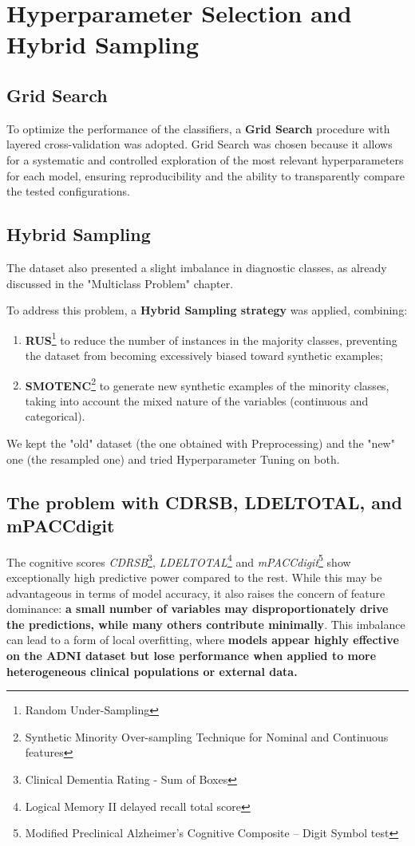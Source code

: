 \section{Hyperparameter Selection and Hybrid Sampling}
\subsection{Grid Search}
To optimize the performance of the classifiers, a \textbf{Grid Search} procedure with layered cross-validation was adopted. Grid Search was chosen because it allows for a systematic and controlled exploration of the most relevant hyperparameters for each model, ensuring reproducibility and the ability to transparently compare the tested configurations.

\subsection{Hybrid Sampling}
The dataset also presented a slight imbalance in diagnostic classes, as already discussed in the "Multiclass Problem" chapter. 


To address this problem, a \textbf{Hybrid Sampling strategy} was applied, combining:
\begin{enumerate}
	\item \textbf{RUS}\footnote{Random Under-Sampling} to reduce the number of instances in the majority classes, preventing the dataset from becoming excessively biased toward synthetic examples;
	\item \textbf{SMOTENC}\footnote{Synthetic Minority Over-sampling Technique for Nominal and Continuous features} to generate new synthetic examples of the minority classes, taking into account the mixed nature of the variables (continuous and categorical).
\end{enumerate}
We kept the "old" dataset (the one obtained with Preprocessing) and the "new" one (the resampled one) and tried Hyperparameter Tuning on both. 

\subsection{The problem with CDRSB, LDELTOTAL, and mPACCdigit}
The cognitive scores \textit{CDRSB}\footnote{Clinical Dementia Rating - Sum of Boxes}, \textit{LDELTOTAL}\footnote{Logical Memory II delayed recall total score} and \textit{mPACCdigit}\footnote{Modified Preclinical Alzheimer’s Cognitive Composite – Digit Symbol test} show exceptionally high predictive power compared to the rest. While this may be advantageous in terms of model accuracy, it also raises the concern of feature dominance: \textbf{a small number of variables may disproportionately drive the predictions, while many others contribute minimally}. This imbalance can lead to a form of local overfitting, where \textbf{models appear highly effective on the ADNI dataset but lose performance when applied to more heterogeneous clinical populations or external data.}


